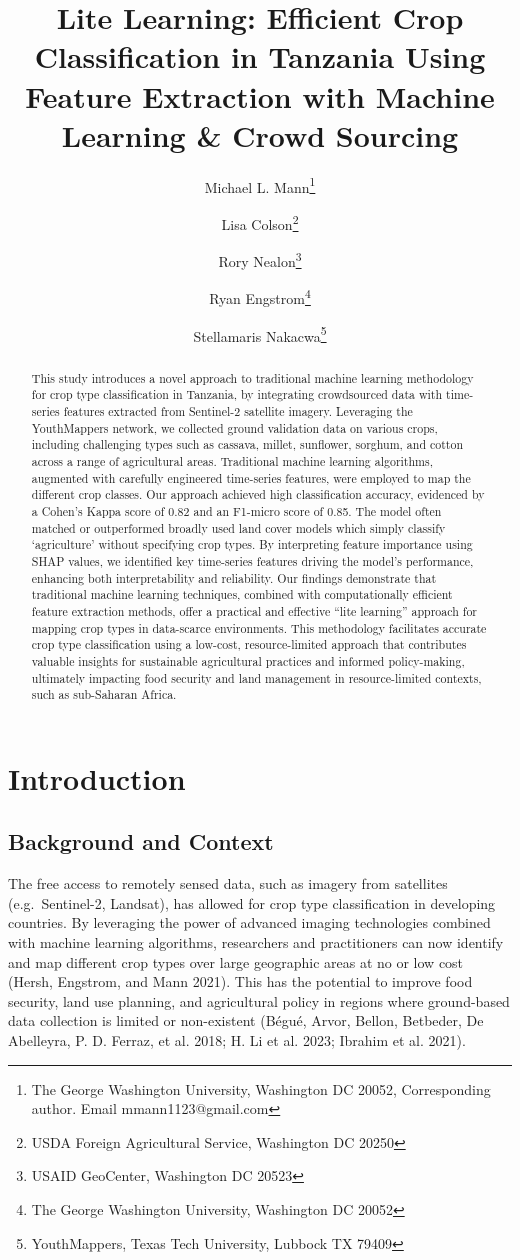 \documentclass[
  journal,
  twocolumn]{IEEEtran}
\title{Lite Learning: Efficient Crop Classification in Tanzania Using
Feature Extraction with Machine Learning \& Crowd Sourcing}
\author{
Michael L. Mann\thanks{The George Washington University, Washington DC
20052, Corresponding author. Email mmann1123@gmail.com} \and 
Lisa Colson\thanks{USDA Foreign Agricultural Service, Washington DC
20250} \and 
Rory Nealon\thanks{USAID GeoCenter, Washington DC 20523} \and 
Ryan Engstrom\thanks{The George Washington University, Washington DC
20052} \and 
Stellamaris Nakacwa\thanks{YouthMappers, Texas Tech University, Lubbock
TX 79409}}
\date{}
\begin{document}
\maketitle
\begin{abstract}
This study introduces a novel approach to traditional machine learning
methodology for crop type classification in Tanzania, by integrating
crowdsourced data with time-series features extracted from Sentinel-2
satellite imagery. Leveraging the YouthMappers network, we collected
ground validation data on various crops, including challenging types
such as cassava, millet, sunflower, sorghum, and cotton across a range
of agricultural areas. Traditional machine learning algorithms,
augmented with carefully engineered time-series features, were employed
to map the different crop classes. Our approach achieved high
classification accuracy, evidenced by a Cohen's Kappa score of 0.82 and
an F1-micro score of 0.85. The model often matched or outperformed
broadly used land cover models which simply classify `agriculture'
without specifying crop types. By interpreting feature importance using
SHAP values, we identified key time-series features driving the model's
performance, enhancing both interpretability and reliability. Our
findings demonstrate that traditional machine learning techniques,
combined with computationally efficient feature extraction methods,
offer a practical and effective ``lite learning'' approach for mapping
crop types in data-scarce environments. This methodology facilitates
accurate crop type classification using a low-cost, resource-limited
approach that contributes valuable insights for sustainable agricultural
practices and informed policy-making, ultimately impacting food security
and land management in resource-limited contexts, such as sub-Saharan
Africa.
\end{abstract}

\hypertarget{introduction}{%
\section{Introduction}\label{introduction}}

\hypertarget{background-and-context}{%
\subsection{Background and Context}\label{background-and-context}}

The free access to remotely sensed data, such as imagery from satellites
(e.g.~Sentinel-2, Landsat), has allowed for crop type classification in
developing countries. By leveraging the power of advanced imaging
technologies combined with machine learning algorithms, researchers and
practitioners can now identify and map different crop types over large
geographic areas at no or low cost (Hersh, Engstrom, and Mann 2021).
This has the potential to improve food security, land use planning, and
agricultural policy in regions where ground-based data collection is
limited or non-existent (Bégué, Arvor, Bellon, Betbeder, De Abelleyra,
P. D. Ferraz, et al. 2018; H. Li et al. 2023; Ibrahim et al. 2021).
\end{document}
